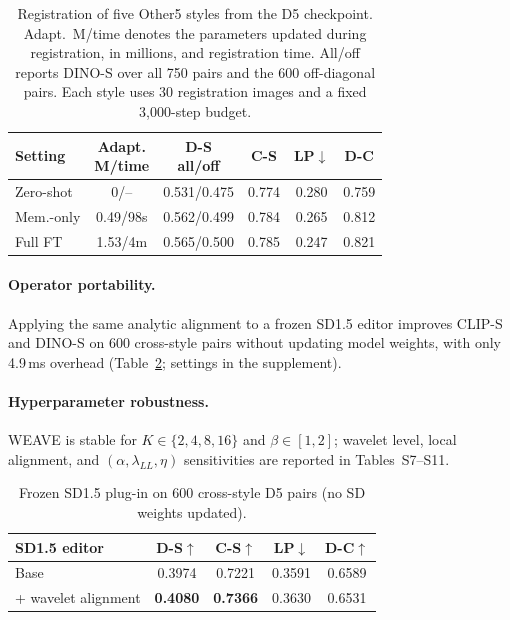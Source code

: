 \documentclass[letterpaper]{article} %
\begin{document}
\begin{table}[t]
\centering
{\small
\setlength{\tabcolsep}{1mm}
\begin{tabular}{@{}lccccc@{}}
\toprule
Setting & \shortstack{Adapt.\\M/time} & \shortstack{D-S\\all/off} & C-S & LP$\downarrow$ & D-C \\
\midrule
Zero-shot & 0/-- & 0.531/0.475 & 0.774 & 0.280 & 0.759 \\
Mem.-only & 0.49/98s & 0.562/0.499 & 0.784 & 0.265 & 0.812 \\
Full FT & 1.53/4m & 0.565/0.500 & 0.785 & 0.247 & 0.821 \\
\bottomrule
\end{tabular}
}
\caption{Registration of five Other5 styles from the D5 checkpoint. Adapt.\ M/time denotes the parameters updated during registration, in millions, and registration time. All/off reports DINO-S over all 750 pairs and the 600 off-diagonal pairs. Each style uses 30 registration images and a fixed 3{,}000-step budget.}
\label{tab:register}
\end{table}

\paragraph{Operator portability.}
Applying the same analytic alignment to a frozen SD1.5 editor improves CLIP-S and DINO-S on
600 cross-style pairs without updating model weights, with only 4.9\,ms overhead
(Table~\ref{tab:plugin}; settings in the supplement).

\paragraph{Hyperparameter robustness.}
WEAVE is stable for $K\in\{2,4,8,16\}$ and $\beta\in[1,2]$; wavelet
level, local alignment, and $(\alpha,\lambda_{LL},\eta)$ sensitivities
are reported in Tables~S7--S11.

\begin{table}[!ht]
\centering
{\small
\setlength{\tabcolsep}{4pt}
\begin{tabular}{@{}lcccc@{}}
\toprule
SD1.5 editor & D-S$\uparrow$ & C-S$\uparrow$ & LP$\downarrow$ & D-C$\uparrow$ \\
\midrule
Base & 0.3974 & 0.7221 & 0.3591 & 0.6589 \\
+ wavelet alignment & \textbf{0.4080} & \textbf{0.7366} & 0.3630 & 0.6531 \\
\bottomrule
\end{tabular}
}
\caption{Frozen SD1.5 plug-in on 600 cross-style D5 pairs (no SD weights updated).}
\label{tab:plugin}
\end{table}
\end{document}
